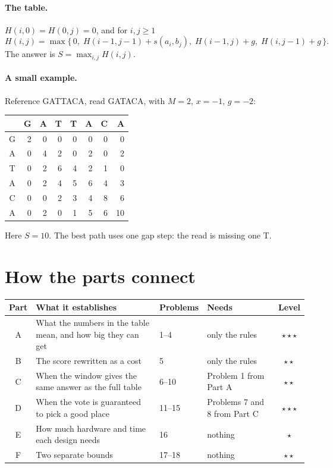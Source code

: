 \documentclass[11pt]{article}
\newcommand{\easy}{$\star$}
\newcommand{\medium}{$\star\star$}
\newcommand{\hard}{$\star\star\star$}
\begin{document}
\paragraph{The table.} $H(i,0) = H(0,j) = 0$, and for $i,j \ge 1$
\begin{equation}\label{eq:sw}
H(i,j) = \max\bigl\{\,0,\; H(i-1,j-1) + s(a_i,b_j),\; H(i-1,j) + g,\; H(i,j-1) + g \,\bigr\}.
\end{equation}
The answer is $S = \max_{i,j} H(i,j)$.

\paragraph{A small example.} Reference GATTACA, read GATACA, with $M=2$,
$x=-1$, $g=-2$:
\begin{center}
\begin{tabular}{c|rrrrrrr}
  & G & A & T & T & A & C & A \\ \hline
G & 2 & 0 & 0 & 0 & 0 & 0 & 0 \\
A & 0 & 4 & 2 & 0 & 2 & 0 & 2 \\
T & 0 & 2 & 6 & 4 & 2 & 1 & 0 \\
A & 0 & 2 & 4 & 5 & 6 & 4 & 3 \\
C & 0 & 0 & 2 & 3 & 4 & 8 & 6 \\
A & 0 & 2 & 0 & 1 & 5 & 6 & 10
\end{tabular}
\end{center}
Here $S = 10$. The best path uses one gap step: the read is missing one T.

\section{How the parts connect}\label{sec:map}

\begin{center}
\renewcommand{\arraystretch}{1.25}
\begin{tabular}{@{}cp{}p{}p{}c@{}}
\toprule
Part & What it establishes & Problems & Needs & Level \\
\midrule
A & What the numbers in the table mean, and how big they can get & 1--4 & only the rules & \hard \\
B & The score rewritten as a cost & 5 & only the rules & \medium \\
C & When the window gives the same answer as the full table & 6--10 & Problem 1 from Part A & \medium \\
D & When the vote is guaranteed to pick a good place & 11--15 & Problems 7 and 8 from Part C & \hard \\
E & How much hardware and time each design needs & 16 & nothing & \easy \\
F & Two separate bounds & 17--18 & nothing & \medium \\
\bottomrule
\end{tabular}
\end{center}
\end{document}
